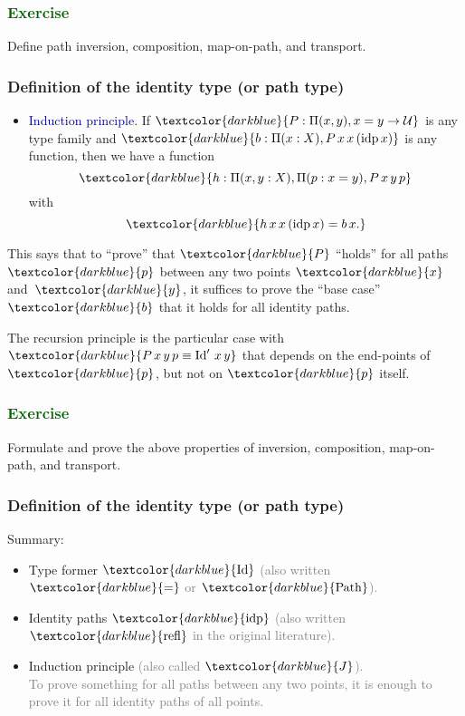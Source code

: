 \documentclass[aspectratio=169]{beamer}
\newcommand{\eqq}{\equiv}
\newcommand{\U}{\operatorname{\mathcal{U}}}
\newcommand{\db}{\textcolor{darkblue}}
\newcommand{\dg}{\textcolor{darkgreen}}
\newcommand{\grey}{\textcolor{grey}}
\newcommand{\m}[1]{$\db{#1}$}
\newcommand{\M}[1]{\[\db{#1}\]}
\newcommand{\refl}{\operatorname{refl}}
\newcommand{\idp}{\operatorname{idp}}
\newcommand{\Id}{\operatorname{Id}}
\newcommand{\Path}{\operatorname{Path}}
\begin{document}
\begin{frame} \frametitle{\dg{Exercise}}

  Define path inversion, composition, map-on-path, and transport.

\end{frame}


 \begin{frame}
  \frametitle{Definition of the identity type (or path type)}

  \begin{itemize}
  \item \db{Induction principle}. If \m{P : \Pi(x,y), x=y \to \U} is any type family and \m{b : \Pi(x:X), P\,x\,x\,(\idp x)} is any function, then we have a function
    \M{h : \Pi(x,y:X), \Pi(p:x=y), P\,x\,y\, p}
    with
    \M{h \, x \, x\, (\idp x) = b\, x.}
  \end{itemize}

  \vfill

  This says that to ``prove'' that \m{P} ``holds'' for all paths \m{p}
  between any two points \m{x} and~\m{y}, it suffices to prove the
  ``base case'' \m{b} that it holds for all identity paths.

  \vfill

  The recursion principle is the particular case with \m{P \, x\,y\,p
    \eqq \Id' \,x \,y} that depends on the end-points of \m{p}, but not
  on \m{p} itself.

 \end{frame}

\begin{frame} \frametitle{\dg{Exercise}}

  Formulate and prove the above properties of inversion, composition, map-on-path, and transport.

\end{frame}


 \begin{frame}
  \frametitle{Definition of the identity type (or path type)}

  Summary:
  \begin{itemize}
  \vfill \item Type former \m{\Id} \grey{(also written \m{=} or \m{\Path}).}
  \vfill \item Identity paths \m{\idp} \grey{(also written \m{\refl} in the original literature).}
  \vfill \item Induction principle \grey{(also called \m{J}).} \\[1ex] \grey{To prove something for all paths between any two points, it is enough to prove it for all identity paths of all points.}
  \end{itemize}

 \end{frame}
\end{document}
